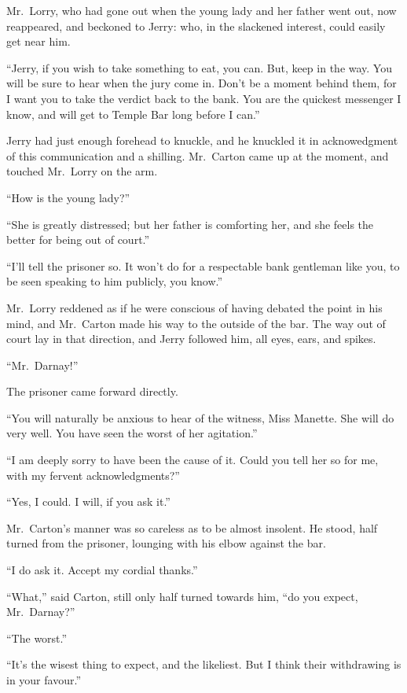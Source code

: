 Mr.\ Lorry, who had gone out when the young lady and her father went out,
now reappeared, and beckoned to Jerry:  who, in the slackened interest,
could easily get near him.

``Jerry, if you wish to take something to eat, you can.  But, keep in
the way.  You will be sure to hear when the jury come in.  Don't be a
moment behind them, for I want you to take the verdict back to the bank.
You are the quickest messenger I know, and will get to Temple Bar long
before I can.''

Jerry had just enough forehead to knuckle, and he knuckled it in
acknowedgment of this communication and a shilling.  Mr.\ Carton came
up at the moment, and touched Mr.\ Lorry on the arm.

``How is the young lady?''

``She is greatly distressed; but her father is comforting her, and she
feels the better for being out of court.''

``I'll tell the prisoner so.  It won't do for a respectable bank
gentleman like you, to be seen speaking to him publicly, you know.''

Mr.\ Lorry reddened as if he were conscious of having debated the point
in his mind, and Mr.\ Carton made his way to the outside of the bar.
The way out of court lay in that direction, and Jerry followed him,
all eyes, ears, and spikes.

``Mr.\ Darnay!''

The prisoner came forward directly.

``You will naturally be anxious to hear of the witness, Miss Manette.
She will do very well.  You have seen the worst of her agitation.''

``I am deeply sorry to have been the cause of it.  Could you tell her
so for me, with my fervent acknowledgments?''

``Yes, I could.  I will, if you ask it.''

Mr.\ Carton's manner was so careless as to be almost insolent.  He stood,
half turned from the prisoner, lounging with his elbow against the bar.

``I do ask it.  Accept my cordial thanks.''

``What,'' said Carton, still only half turned towards him, ``do you
expect, Mr.\ Darnay?''

``The worst.''

``It's the wisest thing to expect, and the likeliest.  But I think
their withdrawing is in your favour.''

